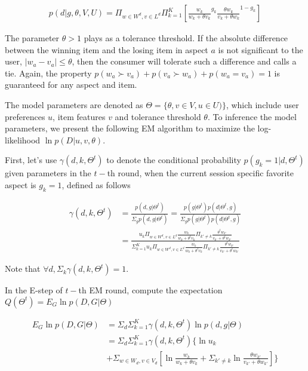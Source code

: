 \documentclass[sigconf]{acmart}
\begin{document}
\begin{align}\label{equ:skyline}
		p(d|g,\theta,V,U) %
		=\Pi_{w\in W^d, v\in L^d} \Pi_{k=1}^{K}[ {\frac{w_k}{w_k+\theta v_k}}^{g_k} { \frac{\theta w_{k}}{v_{k}+\theta w_{k}}}^{1-g_k}]
\end{align}

The parameter $\theta>1$ plays as a tolerance threshold. If the absolute difference between the winning item and the losing item in aspect $a$ is not significant to the user, $|w_a-v_a|\leq \theta$, then the consumer will tolerate such a difference and calls a tie. Again, the property $p(w_a \succ v_a) + p(v_a \succ w_a) + p( w_a = v_a) =1$ is guaranteed for any aspect and item.
 



The model parameters are denoted as $\Theta=\{\theta,v\in V, u\in U)\}$, which include user preferences $u$, item features $v$ and tolerance threshold $\theta$. To inference the model parameters, we present the following EM algorithm to maximize the log-likelihood $\ln p(D|u,v,\theta)$. 

First, let's use $\gamma(d,k,\Theta^t)$ to denote the conditional probability $p(g_k=1|d,\Theta^t)$ given parameters in the $t-$th round, when the current session specific favorite aspect is $g_k=1$, defined as follows

\begin{align}\label{equ:conditional}
\gamma(d,k,\Theta^t) &=\frac{p(d,g|\Theta^t)}{\Sigma_g p(d,g|\Theta^t)} = \frac{p(g|\Theta^t)p(d|\Theta^t,g)}{\Sigma_g p(g|\Theta^t)p(d|\Theta^t,g)}\\\nonumber
&=\frac{u_k \Pi_{w \in W^d, v\in L^d} \frac{w_k}{w_k+\theta^t v_k}\Pi_{k'\neq k}\frac{\theta^t w_{k'}}{v_{k'}+\theta^t w_{k'}}}{\Sigma_{k=1}^K u_k \Pi_{w \in W^d, v\in L^d} \frac{w_k}{w_k+\theta^t v_k}\Pi_{k'\neq k}\frac{\theta^t w_{k'}}{v_{k'}+\theta^t w_{k'}}}
\end{align}

Note that $\forall d, \Sigma_k \gamma(d,k,\Theta^t)=1$.

In the E-step of $t-$th  EM round, compute the expectation $Q(\Theta^t)=E_{G} \ln p(D,G|\Theta) $

\begin{align}\label{equ:estep}
E_{G} \ln p(D,G|\Theta) & = \Sigma_d \Sigma_{k=1}^K \gamma(d,k,\Theta^t) \ln p(d,g|\Theta)\\\nonumber
& = \Sigma_d \Sigma_{k=1}^K \gamma(d,k,\Theta^t) \{ \ln u_k \\ \nonumber
&+ \Sigma_{w\in W_d, v\in V_d} [\ln \frac{w_k}{w_k +\theta v_k} +\Sigma_{k'\neq k} \ln \frac{\theta w_{k'}}{v_{k'}+\theta w_{k'}}]\}
\end{align}
\end{document}
